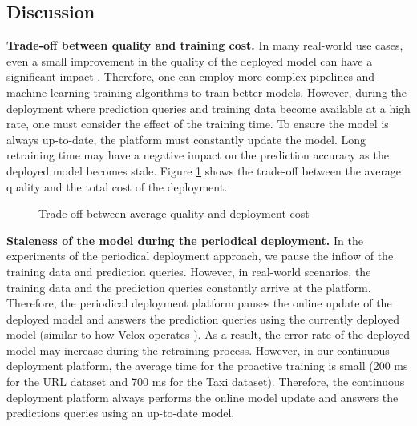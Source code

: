 \subsection{Discussion} \label{subsec:discussion}
\textbf{Trade-off between quality and training cost.}
In many real-world use cases, even a small improvement in the quality of the deployed model can have a significant impact  \cite{ling2017model}.
Therefore, one can employ more complex pipelines and machine learning training algorithms to train better models.
However, during the deployment where prediction queries and training data become available at a high rate, one must consider the effect of the training time.
To ensure the model is always up-to-date, the platform must constantly update the model.
Long retraining time may have a negative impact on the prediction accuracy as the deployed model becomes stale.
Figure \ref{trade-off-figure} shows the trade-off between the average quality and the total cost of the deployment.
\begin{figure}[!h]
\centering
\resizebox{\columnwidth}{!}{}
\caption{Trade-off between average quality and deployment cost}
 \vspace{-10pt}
\label{trade-off-figure}
\end{figure}

\textbf{Staleness of the model during the periodical deployment.}
In the experiments of the periodical deployment approach, we pause the inflow of the training data and prediction queries.
However, in real-world scenarios, the training data and the prediction queries constantly arrive at the platform.
Therefore, the periodical deployment platform pauses the online update of the deployed model and answers the prediction queries using the currently deployed model (similar to how Velox operates \cite{crankshaw2014missing}).
As a result, the error rate of the deployed model may increase during the retraining process.
However, in our continuous deployment platform, the average time for the proactive training is small (200 ms for the URL dataset and 700 ms for the Taxi dataset).
Therefore, the continuous deployment platform always performs the online model update and answers the predictions queries using an up-to-date model.